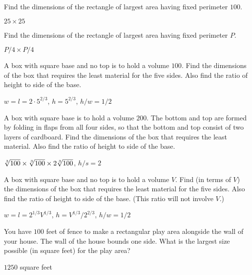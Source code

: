 \begin{exercises}


\begin{exercise}
Find the dimensions of the rectangle of largest area having fixed perimeter
$100$.
\begin{answer} $25\times 25$
\end{answer}\end{exercise}


\begin{exercise}
Find the dimensions of the rectangle of largest area having fixed perimeter
$P$.
\begin{answer} $P/4\times P/4$
\end{answer}\end{exercise}

\begin{exercise}
A box with square base and no top is to hold a volume $100$.  Find
the dimensions of the box that requires the least material for the
five sides.  Also find the ratio of height to side of the base.
\begin{answer} $w=l=2\cdot 5^{2/3}$, $h=5^{2/3}$, $h/w=1/2$
\end{answer}\end{exercise}


\begin{exercise} A box with square base is to hold a volume
$200$. The bottom and top are formed by folding in flaps from all four
sides, so that the bottom and top consist of two layers of cardboard.
Find the dimensions of the box that requires the least material.
Also find the ratio of height to side of the base.
\begin{answer} $\root 3\of {100}\times\root 3\of {100}\times 2\root 3\of
{100}$, $h/s=2$
\end{answer}\end{exercise}

\begin{exercise}
A box with square base and no top is to hold a volume $V$.  Find (in terms
of $V$) the dimensions of the box that requires the least material for the
five sides.  Also find the ratio of height to side of the base.  (This
ratio will not involve $V$.)
\begin{answer} $w=l=2^{1/3}V^{1/3}$, $h=V^{1/3}/2^{2/3}$, $h/w=1/2$
\end{answer}\end{exercise}

\begin{exercise}
You have $100$ feet of fence to make a rectangular play area alongside the
wall of your house.  The wall of the house bounds one side.  What is the
largest size possible (in square feet) for the play area?
\begin{answer} $1250$ square feet
\end{answer}\end{exercise}


\end{exercises}
